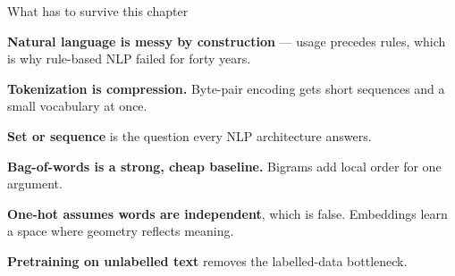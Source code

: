 \documentclass[aspectratio=169,11pt,t]{beamer}
\begin{document}
\begin{frame}[shrink=25]{What has to survive this chapter}
\begin{isteps}
\item \textbf{Natural language is messy by construction} --- usage precedes rules, which is why rule-based NLP failed for forty years.
\item \textbf{Tokenization is compression.} Byte-pair encoding gets short sequences and a small vocabulary at once.
\item \textbf{Set or sequence} is the question every NLP architecture answers.
\item \textbf{Bag-of-words is a strong, cheap baseline.} Bigrams add local order for one argument.
\item \textbf{One-hot assumes words are independent}, which is false. Embeddings learn a space where geometry reflects meaning.
\item \textbf{Pretraining on unlabelled text} removes the labelled-data bottleneck.
\end{isteps}
\vskip 4pt
\vskip 2pt
\end{frame}
\end{document}
